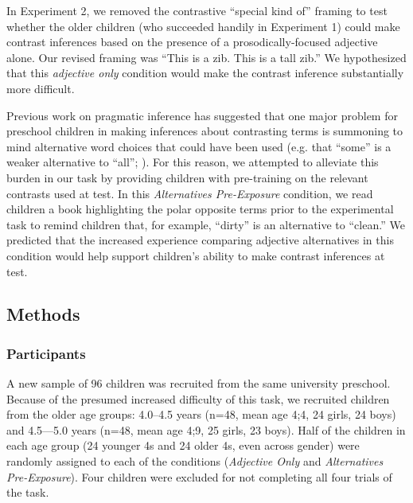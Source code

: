 \documentclass[man]{apa2}
\begin{document}

In Experiment 2, we removed the contrastive ``special kind of'' framing to test whether the older children (who succeeded handily in Experiment 1) could make contrast inferences based on the presence of a prosodically-focused adjective alone. Our revised framing was ``This is a zib. This is a tall zib.'' We hypothesized that this \emph{adjective only} condition would make the contrast inference substantially more difficult. 

Previous work on pragmatic inference has suggested that one major problem for preschool children in making inferences about contrasting terms is summoning to mind alternative word choices that could have been used (e.g. that ``some'' is a weaker alternative to ``all''; ). For this reason, we attempted to alleviate this burden in our task by providing children with pre-training on the relevant contrasts used at test. In this \emph{Alternatives Pre-Exposure} condition, we read children a book highlighting the polar opposite terms prior to the experimental task to remind children that, for example, ``dirty'' is an alternative to ``clean.'' We predicted that the increased experience comparing adjective alternatives in this condition would help support children's ability to make contrast inferences at test.


\subsection{Methods}

\subsubsection{Participants}

A new sample of 96 children was recruited from the same university preschool.  Because of the presumed increased difficulty of this task, we recruited children from the older age groups: 4.0--4.5 years (n=48, mean age 4;4, 24 girls, 24 boys) and 4.5---5.0 years (n=48, mean age 4;9, 25 girls, 23 boys).  Half of the children in each age group (24 younger 4s and 24 older 4s, even across gender) were randomly assigned to each of the conditions (\emph{Adjective Only} and \emph{Alternatives Pre-Exposure}). Four children were excluded for not completing all four trials of the task. 
\end{document}
